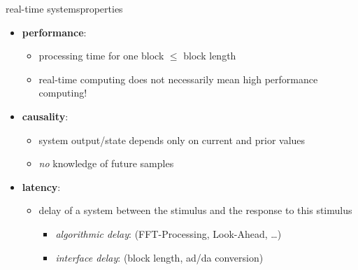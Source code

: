 	\begin{frame}{real-time systems}{properties}
		\begin{itemize}
			\item	\textbf{performance}:
				\begin{itemize}
					\item	processing time for one block $\leq$ block length
                    \pause
                    \item   real-time computing does not necessarily mean high performance computing!
				\end{itemize}
			\bigskip
            \pause
			\item	\textbf{causality}:
				\begin{itemize}
                    \item   system output/state depends only on current and prior values
					\item	\textit{no} knowledge of future samples
				\end{itemize}
			\bigskip
			\pause
			\item	\textbf{latency}:
				\begin{itemize}
					\item	delay of a system between the stimulus and the response to
this stimulus
						\begin{itemize}
							\item	\textit{algorithmic delay}: (FFT-Processing, Look-Ahead, \ldots)
							\item	\textit{interface delay}: (block length, ad/da conversion)
						\end{itemize}
				\end{itemize}

		\end{itemize}
	\end{frame}

